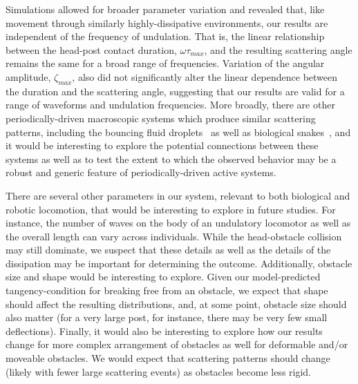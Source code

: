 \documentclass[aps,pre,twocolumn,superscriptaddress]{revtex4-1}
\begin{document}
Simulations allowed for broader parameter variation and revealed that, like movement through similarly highly-dissipative environments, our results are independent of the frequency of undulation.  That is, the linear relationship between the head-post contact duration,  $\omega \tau_{max}$, and the resulting scattering angle remains the same for a broad range of frequencies.  Variation of the angular amplitude, $\zeta_{max}$, also did not significantly alter the linear dependence between the duration and the scattering angle, suggesting that our results are valid for a range of waveforms and undulation frequencies. More broadly, there are other periodically-driven macroscopic systems which produce similar scattering patterns, including the bouncing fluid droplets~\cite{Couder:2006ix,Bush:2015ev} as well as biological snakes~\cite{schiebel2018}, and it would be interesting to explore the potential connections between these systems as well as to test the extent to which the observed behavior may be a robust and generic feature of periodically-driven active systems.

There are several other parameters in our system, relevant to both biological and robotic locomotion, that would be interesting to explore in future studies.  For instance, the number of waves on the body of  an undulatory locomotor as well as the overall length can vary across individuals. While the head-obstacle collision may still dominate, we suspect that these details as well as the details of the dissipation may be important for determining the outcome.  Additionally, obstacle size and shape would be interesting to explore.  Given our model-predicted tangency-condition for breaking free from an obstacle, we expect that shape should affect the resulting distributions, and, at some point, obstacle size should also matter (for a very large post, for instance, there may be very few small deflections).  Finally, it would also be interesting to explore how our results change for more complex arrangement of obstacles as well  for deformable and/or moveable obstacles.  We would expect that scattering patterns should change (likely with fewer large scattering events) as obstacles become less rigid.
\end{document}
